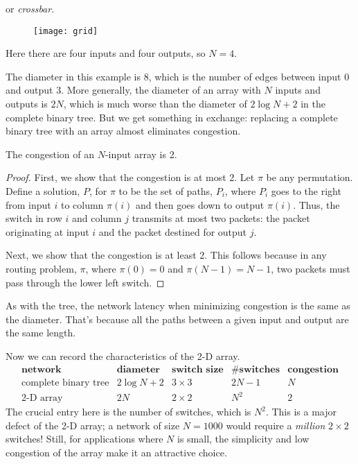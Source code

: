 \begin{editingnotes}
or \emph{crossbar}.
\end{editingnotes}
\begin{figure}
\texttt{[image: grid]}
\end{figure}
Here there are four inputs and four outputs, so $N = 4$.

The diameter in this example is 8, which is the number of edges
between input 0 and output 3.  More generally, the diameter of an
array with $N$ inputs and outputs is $2N$, which is much worse than
the diameter of $2 \log N + 2$ in the complete binary tree.  But we
get something in exchange: replacing a complete binary tree with an
array almost eliminates congestion.

\begin{theorem}
The congestion of an $N$-input array is 2.
\end{theorem}

\begin{proof}
First, we show that the congestion is at most 2.  Let $\pi$ be any
permutation.  Define a solution, $P$, for $\pi$ to be the set of paths,
$P_i$, where $P_i$ goes to the right from input $i$ to column $\pi(i)$ and
then goes down to output $\pi(i)$.  Thus, the switch in row $i$ and column
$j$ transmits at most two packets: the packet originating at input
$i$ and the packet destined for output $j$.

Next, we show that the congestion is at least 2.  This follows because in
any routing problem, $\pi$, where $\pi(0) = 0$ and $\pi(N-1) =
N-1$, two packets must pass through the lower left switch.
\end{proof}

As with the tree, the network latency when minimizing congestion is the
same as the diameter.  That's because all the paths between a given input
and output are the same length.

Now we can record the characteristics of the 2-D array.
%
\[
\begin{array}{r|c|c|c|c}
\textbf{network} &
\textbf{diameter} &
\textbf{switch size} &
\textbf{\# switches} &
\textbf{congestion} \\ \hline
\text{complete binary tree} & 2 \log N + 2 & 3 \times 3 & 2N - 1 & N \\
\text{2-D array} & 2 N & 2 \times 2 & N^2 & 2
\end{array}
\]
%
The crucial entry here is the number of switches, which is $N^2$.
This is a major defect of the 2-D array; a network of size $N = 1000$
would require a \textit{million} $2 \times 2$ switches!  Still, for
applications where $N$ is small, the simplicity and low congestion of
the array make it an attractive choice.


